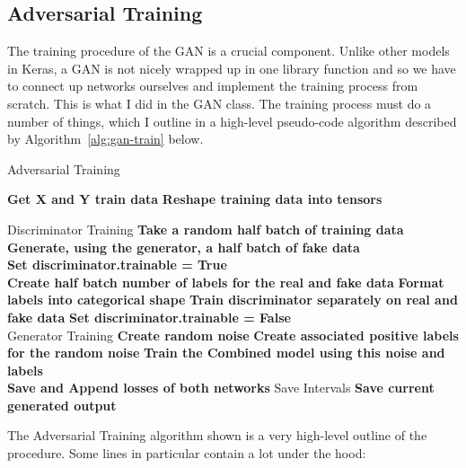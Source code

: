 \documentclass[12pt,a4paper,twoside]{report}
\begin{document}
\subsection{Adversarial Training}

The training procedure of the GAN is a crucial component. Unlike other models in Keras, a GAN is not nicely wrapped up in one library function and so we have to connect up networks ourselves and implement the training process from scratch. This is what I did in the GAN class. The training process must do a number of things, which I outline in a high-level pseudo-code algorithm described by Algorithm~\ref{alg:gan-train} below.

\begin{algorithm}[!htbp]
\caption{Adversarial Training }\label{alg:gan-train}
\begin{algorithmic}[1]
	
        \State \textbf{Get X and Y train data}
        \State \textbf{Reshape training data into tensors} 
        \State 
         
		\State
		\Comment Discriminator Training 
		\State \textbf{Take a random half batch of training data}
		\State \textbf{Generate, using the generator, a half batch of fake data}\\
		\State \textbf{Set discriminator.trainable = True}\\
		\State \textbf{Create half batch number of labels for the real and fake data}
		\State \textbf{Format labels into categorical shape}
		\State \textbf{Train discriminator separately on real and fake data}
		\State \textbf{Set discriminator.trainable = False}\\
		\State
		\Comment Generator Training 
		\State \textbf{Create random noise} 
		\State \textbf{Create associated positive labels for the random noise}
		\State \textbf{Train the Combined model using this noise and labels}\\
		\State \textbf{Save and Append losses of both networks }
		\State
		\Comment Save Intervals
			\State \textbf{Save current generated output}
		\EndIf
   	\EndFor
   
\EndProcedure
\end{algorithmic}
\end{algorithm}

The Adversarial Training algorithm shown is a very high-level outline of the procedure. Some lines in particular contain a lot under the hood:
\end{document}
